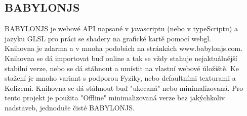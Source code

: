 \documentclass[a4paper,titlepage]{article}
\begin{document}
	\subsection{BABYLONJS}	
		BABYLONJS je webové API napsané v javascriptu (nebo v typeScriptu) a
		jazyku GLSL pro práci se shadery na grafické kartě pomocí webgl.\\
		Knihovna je zdarma a v mnoha podobách na stránkách www.babylonjs.com\cite{BabylonJS}.
		Knihovna se dá importovat buď online a
		tak se vždy stahuje nejaktuálnější stabilní verze, nebo
		se dá stáhnout a umístit na vlastní webové úložiště.
		Ke stažení je mnoho variant s podporou Fyziky, nebo defaultními texturami a Kolizemi.
		Knihovna se dá stáhnout buď "ukecaná" nebo minimalizovaná.
		Pro tento projekt je použita "Offline" minimalizovaná verze bez jakýchkoliv nadstaveb, jednoduše čisté BABYLONJS.
\end{document}
